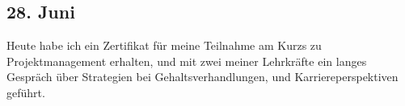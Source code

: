 \subsection{28. Juni}
Heute habe ich ein Zertifikat für meine Teilnahme am Kurzs zu Projektmanagement erhalten, und mit zwei meiner Lehrkräfte ein langes Gespräch über Strategien bei Gehaltsverhandlungen, und Karriereperspektiven geführt. 
